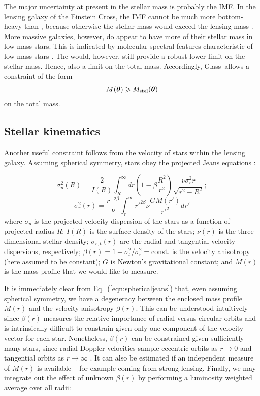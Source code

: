 \documentclass[galley,usenatbib]{mn2e}
\newcommand{\Glass}{{\sc Glass}}
\newcommand{\eqnref}[1] {Eq.~(\ref{#1})}
\renewcommand{\vec}[1]{\ensuremath{\boldsymbol{#1}}}
\begin{document}
The major uncertainty at present in the stellar mass is probably the
IMF.  In the lensing galaxy of the Einstein Cross, the IMF cannot be
much more bottom-heavy than \cite{2003PASP..115..763C}, because
otherwise the stellar mass would exceed the lensing mass
\cite{2010MNRAS.409L..30F}.  More massive galaxies, however, do appear
to have more of their stellar mass in low-mass stars.  This is
indicated by molecular spectral features characteristic of low mass
stars
\citep{2004ApJ...614L.101C,2012ApJ...747...69C,2013MNRAS.429L..15F}.
The \cite{2003PASP..115..763C} would, however, still provide a robust
lower limit on the stellar mass.  Hence, also a limit on the total
mass.  Accordingly, \Glass\ allows a constraint of the form
\begin{equation} 
M(\vec\theta) \geq M_{\rm stel}(\vec\theta)
\end{equation} 
on the total mass.

\subsection{Stellar kinematics}\label{sec:kinematics} 

Another useful constraint follows from the velocity of stars within the lensing galaxy. Assuming spherical symmetry, stars obey the projected Jeans equations \citep[e.g.][]{2008gady.book.....B}: 

\begin{equation}
\sigma_p^2(R) = \frac{2}{I(R)}\int_R^\infty dr \left(1-\beta \frac{R^2}{r^2}\right) \frac{\nu \sigma_r^2 r}{\sqrt{r^2 - R^2}};
\label{eqn:sphericaljeans}
\end{equation}
\begin{equation} 
\sigma_r^2(r) = \frac{r^{-2\beta}}{\nu}\int_r^\infty r'^{2\beta} \nu \frac{GM(r')}{r'^2}dr'
\end{equation} 
where $\sigma_p$ is the projected velocity dispersion of the stars as a function of projected radius $R$; $I(R)$ is the surface density of the stars; $\nu(r)$ is the three dimensional stellar density; $\sigma_{r,t}(r)$ are the radial and tangential velocity dispersions, respectively; $\beta(r) = 1 - \sigma_t^2/\sigma_r^2 = \mathrm{const.}$ is the velocity anisotropy (here assumed to be constant); $G$ is Newton's gravitational constant; and $M(r)$ is the mass profile that we would like to measure. 

It is immediately clear from \eqnref{eqn:sphericaljeans} that, even assuming spherical symmetry, we have a degeneracy between the enclosed mass profile $M(r)$ and the velocity anisotropy $\beta(r)$. This can be understood intuitively since $\beta(r)$ measures the relative importance of radial versus circular orbits and is intrinsically difficult to constrain given only one component of the velocity vector for each star. Nonetheless, $\beta(r)$ can be constrained given sufficiently many stars, since radial Doppler velocities sample eccentric orbits as $r\rightarrow 0$ and tangential orbits as $r\rightarrow \infty$ \citep[e.g.][]{2002MNRAS.330..778W}. It can also be estimated if an independent measure of $M(r)$ is available -- for example coming from strong lensing. Finally, we may integrate out the effect of unknown $\beta(r)$ by performing a luminosity weighted average over all radii: 
\end{document}
